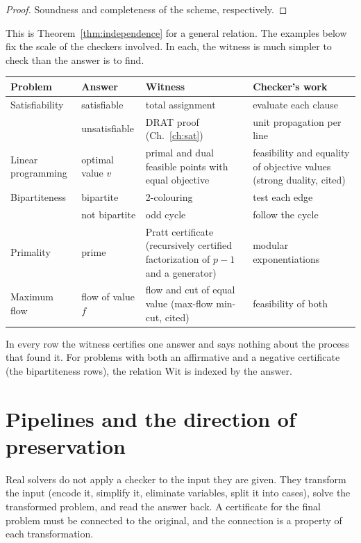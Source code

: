 \begin{proof}
Soundness and completeness of the scheme, respectively.
\end{proof}

This is Theorem~\ref{thm:independence} for a general relation. The examples below fix the scale of the checkers involved. In each, the witness is much simpler to check than the answer is to find.

\begin{center}
\small
\begin{tabular}{p{2.8cm}p{2.7cm}p{3.6cm}p{3.2cm}}
\toprule
Problem & Answer & Witness & Checker's work\\
\midrule
Satisfiability & satisfiable & total assignment & evaluate each clause\\
 & unsatisfiable & DRAT proof (Ch.~\ref{ch:sat}) & unit propagation per line\\
Linear programming & optimal value $v$ & primal and dual feasible points with equal objective & feasibility and equality of objective values (strong duality, cited)\\
Bipartiteness & bipartite & 2-colouring & test each edge\\
 & not bipartite & odd cycle & follow the cycle\\
Primality & prime & Pratt certificate (recursively certified factorization of $p-1$ and a generator) & modular exponentiations\\
Maximum flow & flow of value $f$ & flow and cut of equal value (max-flow min-cut, cited) & feasibility of both\\
\bottomrule
\end{tabular}
\end{center}

In every row the witness certifies one answer and says nothing about the process that found it. For problems with both an affirmative and a negative certificate (the bipartiteness rows), the relation $\mathrm{Wit}$ is indexed by the answer.

\section{Pipelines and the direction of preservation}
\label{sec:pipelines}

Real solvers do not apply a checker to the input they are given. They transform the input (encode it, simplify it, eliminate variables, split it into cases), solve the transformed problem, and read the answer back. A certificate for the final problem must be connected to the original, and the connection is a property of each transformation.

